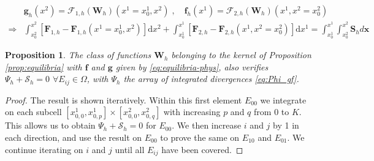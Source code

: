 \documentclass[10pt,a4paper]{amsart}
\newtheorem{proposition}{Proposition}
\begin{document}
 \begin{equation}\label{eq:equilibria-phys}
 \begin{aligned}
 &\mathbf{g}_h(x^2) =  \mathcal{F}_{1,h}(\mathbf{W}_h)(x^1 =x^1_0,x^2)\;, \quad   \mathbf{f}_h(x^1) =\mathcal{F}_{2,h}(\mathbf{W}_h)(x^1, x^2 =x^2_0)\\
\Rightarrow & \int_{x^2_0}^{x^2}[\mathbf{F}_{1,h}-\mathbf{F}_{1,h}(x^1 =x^1_0,x^2) ] \mathrm{d}x^2 + \int_{x^1_0}^{x^1}[\mathbf{F}_{2,h}-\mathbf{F}_{2,h}(x^1,x^2=x^2_0) ] \mathrm{d}x^1=
 \int_{x^1_0}^{x^1} \int_{x^2_0}^{x^2}\mathbf{S}_hd\mathbf{x}
\end{aligned}
 \end{equation} 

\begin{proposition}\label{prop:equilibria_local}
The class of functions $\mathbf{W}_h$ belonging to the kernel of Proposition \ref{prop:equilibria} 
with $\mathbf f$ and $\mathbf g$ given by \eqref{eq:equilibria-phys}, also verifies    $\Psi_h+\mathcal{S}_h=0$  $\forall E_{ij}\in \Omega$,
with $\Psi_h$  the  array of integrated divergences  \eqref{eq:Phi_gf}.
\end{proposition}

\begin{proof}
 The result is shown iteratively. 
 Within this first element $E_{00}$ we integrate on each subcell $[x^1_{0,0},x^1_{0,p}]\times [x^2_{0,0},x^2_{0,q}]$ with increasing $p$ and $q$ from $0$ to $K$.
 This allows us to obtain $\Psi_h+\mathcal{S}_h=0$  for $E_{00}$. We then  increase $i$ and $j$ by 1 in each direction, and use
 the result on $E_{00}$ to prove the same on $E_{10}$ and $E_{01}$. We continue iterating on $i$ and $j$ until all $E_{ij}$ have been covered.
\end{proof}
\end{document}
